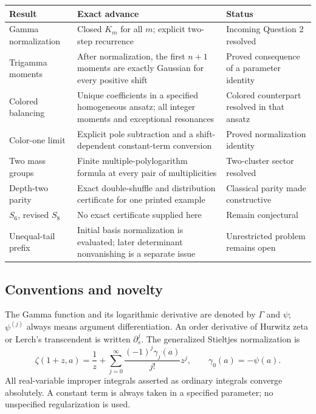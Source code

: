 \documentclass[11pt,a4paper]{article}
\numberwithin{equation}{section}
\theoremstyle{definition}
\theoremstyle{remark}
\begin{document}
\begin{longtable}{@{}>{\raggedright\arraybackslash}p{}>{\raggedright\arraybackslash}p{}>{\raggedright\arraybackslash}p{}@{}}
\toprule
Result & Exact advance & Status\\
\midrule
\endhead
Gamma normalization &
Closed $K_m$ for all $m$; explicit two-step recurrence &
Incoming Question 2 resolved\\[3pt]
Trigamma moments &
After normalization, the first $n+1$ moments are exactly Gaussian
for every positive shift &
Proved consequence of a parameter identity\\[3pt]
Colored balancing &
Unique coefficients in a specified homogeneous ansatz; all integer
moments and exceptional resonances &
Colored counterpart resolved in that ansatz\\[3pt]
Color-one limit &
Explicit pole subtraction and a shift-dependent constant-term
conversion &
Proved normalization identity\\[3pt]
Two mass groups &
Finite multiple-polylogarithm formula at every pair of multiplicities &
Two-cluster sector resolved\\[3pt]
Depth-two parity &
Exact double-shuffle and distribution certificate for one
printed example &
Classical parity made constructive\\[3pt]
$S_6$, revised $S_8$ &
No exact certificate supplied here &
Remain conjectural\\[3pt]
Unequal-tail prefix &
Initial basis normalization is evaluated; later determinant
nonvanishing is a separate issue &
Unrestricted problem remains open\\
\bottomrule
\end{longtable}

\subsection{Conventions and novelty}

The Gamma function and its logarithmic derivative are denoted by
$\Gamma$ and $\psi$; $\psi^{(j)}$ always means argument differentiation.
An order derivative of Hurwitz zeta or Lerch's transcendent is written
$\partial_s^j$. The generalized Stieltjes normalization is
\begin{equation}\label{eq:stieltjes-convention}
 \zeta(1+z,a)=\frac1z+
  \sum_{j=0}^{\infty}\frac{(-1)^j\gamma_j(a)}{j!}z^j,
 \qquad \gamma_0(a)=-\psi(a).
\end{equation}
All real-variable improper integrals asserted as ordinary integrals
converge absolutely. A constant term is always taken in a specified
parameter; no unspecified regularization is used.
\end{document}
